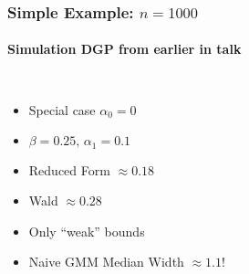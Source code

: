 \documentclass{beamer}
\begin{document}
\begin{frame}
  \frametitle{Simple Example: $n = 1000$}
  \framesubtitle{Simulation DGP from earlier in talk}
  \begin{columns}
    \footnotesize
    \begin{itemize}
      \item Special case $\alpha_0 = 0$
      \item $\beta = 0.25,\, \alpha_1 = 0.1$
      \item Reduced Form $\approx 0.18$
      \item Wald $\approx 0.28$
      \item Only ``weak'' bounds
      \item Naive GMM Median Width $\approx 1.1$!

    \end{itemize}
  \begin{figure}
    \centering
  \end{figure}
  \end{columns}
\end{frame}
\end{document}
